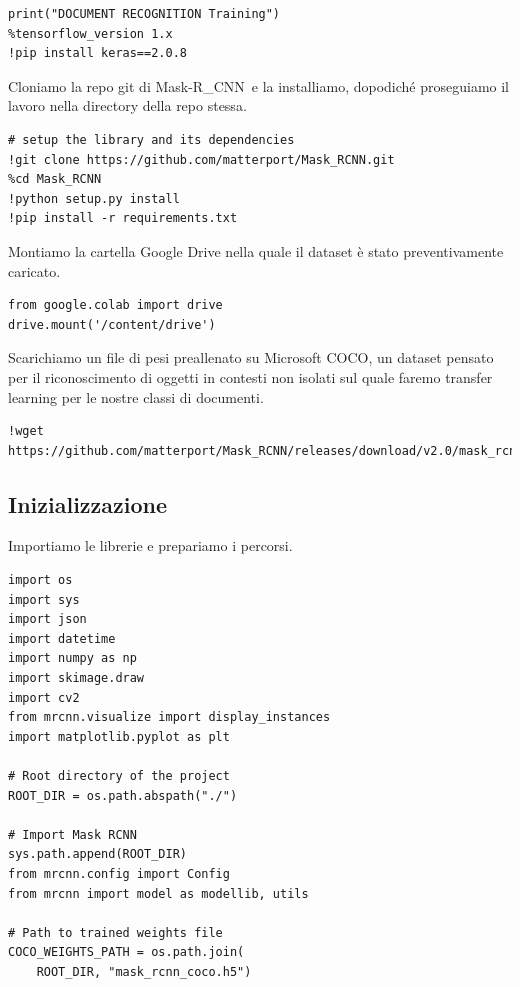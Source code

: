 \documentclass[12pt,a4paper]{article}
\newcommand{\mrcnn}{Mask-R\_CNN}
\begin{document}
\begin{verbatim}
print("DOCUMENT RECOGNITION Training")
%tensorflow_version 1.x
!pip install keras==2.0.8
\end{verbatim}

Cloniamo la repo git di \mrcnn\ e la installiamo, dopodiché proseguiamo
il lavoro nella directory della repo stessa.

\begin{verbatim}
# setup the library and its dependencies
!git clone https://github.com/matterport/Mask_RCNN.git
%cd Mask_RCNN
!python setup.py install
!pip install -r requirements.txt
\end{verbatim}

Montiamo la cartella Google Drive nella quale il dataset è stato
preventivamente caricato.

\begin{verbatim}
from google.colab import drive
drive.mount('/content/drive')
\end{verbatim}

Scarichiamo un file di pesi preallenato su Microsoft COCO, un dataset
pensato per il riconoscimento di oggetti in contesti non isolati sul
quale faremo transfer learning per le nostre classi di documenti.

\begin{verbatim}
!wget https://github.com/matterport/Mask_RCNN/releases/download/v2.0/mask_rcnn_coco.h5
\end{verbatim}

\subsection{Inizializzazione}

Importiamo le librerie e prepariamo i percorsi.

\begin{verbatim}
import os
import sys
import json
import datetime
import numpy as np
import skimage.draw
import cv2
from mrcnn.visualize import display_instances
import matplotlib.pyplot as plt

# Root directory of the project
ROOT_DIR = os.path.abspath("./")

# Import Mask RCNN
sys.path.append(ROOT_DIR)
from mrcnn.config import Config
from mrcnn import model as modellib, utils

# Path to trained weights file
COCO_WEIGHTS_PATH = os.path.join(
    ROOT_DIR, "mask_rcnn_coco.h5")
\end{verbatim}
\end{document}
